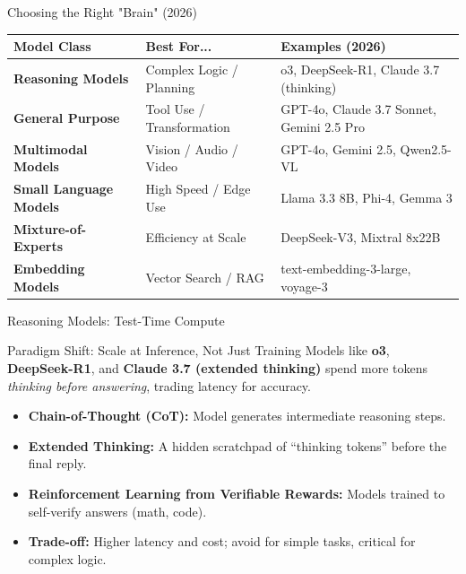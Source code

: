 \documentclass{beamer}       %
\begin{document}
\begin{frame}{Choosing the Right "Brain" (2026)}
    \begin{table}[]
        \centering
        \tiny
        \begin{tabular}{@{}lll@{}}
            \toprule
            \textbf{Model Class} & \textbf{Best For...} & \textbf{Examples (2026)} \\ \midrule
            \textbf{Reasoning Models} & Complex Logic / Planning & o3, DeepSeek-R1, Claude 3.7 (thinking) \\
            \textbf{General Purpose} & Tool Use / Transformation & GPT-4o, Claude 3.7 Sonnet, Gemini 2.5 Pro \\
            \textbf{Multimodal Models} & Vision / Audio / Video & GPT-4o, Gemini 2.5, Qwen2.5-VL \\
            \textbf{Small Language Models} & High Speed / Edge Use & Llama 3.3 8B, Phi-4, Gemma 3 \\
            \textbf{Mixture-of-Experts} & Efficiency at Scale & DeepSeek-V3, Mixtral 8x22B \\
            \textbf{Embedding Models} & Vector Search / RAG & text-embedding-3-large, voyage-3 \\ \bottomrule
        \end{tabular}
    \end{table}
\end{frame}

\begin{frame}{Reasoning Models: Test-Time Compute}
    \begin{block}{Paradigm Shift: Scale at Inference, Not Just Training}
        Models like \textbf{o3}, \textbf{DeepSeek-R1}, and \textbf{Claude 3.7 (extended thinking)} spend
        more tokens \emph{thinking before answering}, trading latency for accuracy.
    \end{block}
    \vspace{0.2cm}
    \begin{itemize}
        \item \textbf{Chain-of-Thought (CoT):} Model generates intermediate reasoning steps.
        \item \textbf{Extended Thinking:} A hidden scratchpad of ``thinking tokens'' before the final reply.
        \item \textbf{Reinforcement Learning from Verifiable Rewards:} Models trained to self-verify answers (math, code).
        \item \textbf{Trade-off:} Higher latency and cost; avoid for simple tasks, critical for complex logic.
    \end{itemize}
\end{frame}
\end{document}

